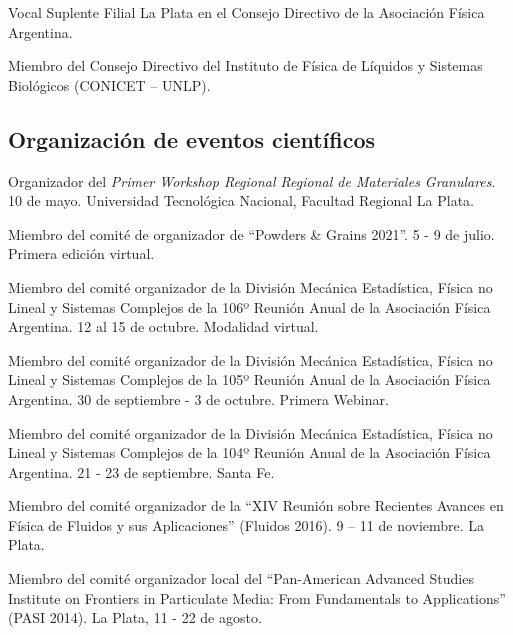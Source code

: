   Vocal Suplente Filial La Plata en el Consejo Directivo de la Asociación Física Argentina.
  
   Miembro del Consejo Directivo del Instituto de Física de Líquidos y Sistemas Biológicos (CONICET -- UNLP).
  

\subsection{Organización de eventos científicos}

 Organizador del \textit{Primer Workshop Regional Regional de Materiales Granulares}. 10 de mayo. Universidad Tecnológica Nacional, Facultad Regional La Plata.

 Miembro del comité de organizador de ``Powders \& Grains 2021''. 5 - 9 de julio. Primera edición virtual.

 Miembro del comité organizador de la División Mecánica Estadística, Física no Lineal y Sistemas Complejos de la 106º Reunión Anual de la Asociación Física Argentina. 12 al 15 de octubre. Modalidad virtual.

 Miembro del comité organizador de la División Mecánica Estadística, Física no Lineal y Sistemas Complejos de la 105º Reunión Anual de la Asociación Física Argentina. 30 de septiembre - 3 de octubre. Primera Webinar.

 Miembro del comité organizador de la División Mecánica Estadística, Física no Lineal y Sistemas Complejos de la 104º Reunión Anual de la Asociación Física Argentina. 21 - 23 de septiembre.
Santa Fe.

 Miembro del comité organizador de la ``XIV Reunión sobre Recientes Avances en Física de Fluidos y sus Aplicaciones'' (Fluidos 2016). 9 -- 11 de noviembre. La Plata.

 Miembro del comité organizador local del ``Pan-American Advanced Studies Institute on Frontiers in Particulate Media: From Fundamentals to Applications'' (PASI 2014). La Plata, 11 - 22 de agosto.
